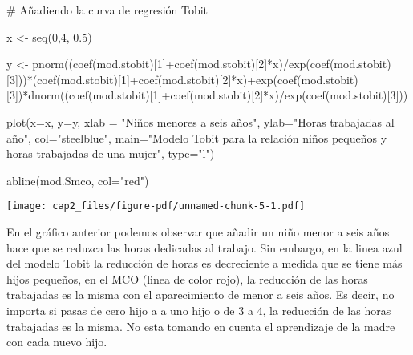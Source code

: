 \documentclass[
  letterpaper,
  DIV=11,
  numbers=noendperiod]{scrreprt}
\newenvironment{Shaded}{\begin{snugshade}}{\end{snugshade}}
\newcommand{\AttributeTok}[1]{\textcolor[rgb]{0.40,0.45,0.13}{#1}}
\newcommand{\CommentTok}[1]{\textcolor[rgb]{0.37,0.37,0.37}{#1}}
\newcommand{\DecValTok}[1]{\textcolor[rgb]{0.68,0.00,0.00}{#1}}
\newcommand{\FloatTok}[1]{\textcolor[rgb]{0.68,0.00,0.00}{#1}}
\newcommand{\FunctionTok}[1]{\textcolor[rgb]{0.28,0.35,0.67}{#1}}
\newcommand{\NormalTok}[1]{\textcolor[rgb]{0.00,0.23,0.31}{#1}}
\newcommand{\OtherTok}[1]{\textcolor[rgb]{0.00,0.23,0.31}{#1}}
\newcommand{\SpecialCharTok}[1]{\textcolor[rgb]{0.37,0.37,0.37}{#1}}
\newcommand{\StringTok}[1]{\textcolor[rgb]{0.13,0.47,0.30}{#1}}
\begin{document}
\begin{Shaded}
\begin{Highlighting}[]
\CommentTok{\# Añadiendo la curva de regresión Tobit}

\NormalTok{x }\OtherTok{\textless{}{-}} \FunctionTok{seq}\NormalTok{(}\DecValTok{0}\NormalTok{,}\DecValTok{4}\NormalTok{, }\FloatTok{0.5}\NormalTok{)}

\NormalTok{y }\OtherTok{\textless{}{-}} \FunctionTok{pnorm}\NormalTok{((}\FunctionTok{coef}\NormalTok{(mod.stobit)[}\DecValTok{1}\NormalTok{]}\SpecialCharTok{+}\FunctionTok{coef}\NormalTok{(mod.stobit)[}\DecValTok{2}\NormalTok{]}\SpecialCharTok{*}\NormalTok{x)}\SpecialCharTok{/}\FunctionTok{exp}\NormalTok{(}\FunctionTok{coef}\NormalTok{(mod.stobit)[}\DecValTok{3}\NormalTok{]))}\SpecialCharTok{*}\NormalTok{(}\FunctionTok{coef}\NormalTok{(mod.stobit)[}\DecValTok{1}\NormalTok{]}\SpecialCharTok{+}\FunctionTok{coef}\NormalTok{(mod.stobit)[}\DecValTok{2}\NormalTok{]}\SpecialCharTok{*}\NormalTok{x)}\SpecialCharTok{+}\FunctionTok{exp}\NormalTok{(}\FunctionTok{coef}\NormalTok{(mod.stobit)[}\DecValTok{3}\NormalTok{])}\SpecialCharTok{*}\FunctionTok{dnorm}\NormalTok{((}\FunctionTok{coef}\NormalTok{(mod.stobit)[}\DecValTok{1}\NormalTok{]}\SpecialCharTok{+}\FunctionTok{coef}\NormalTok{(mod.stobit)[}\DecValTok{2}\NormalTok{]}\SpecialCharTok{*}\NormalTok{x)}\SpecialCharTok{/}\FunctionTok{exp}\NormalTok{(}\FunctionTok{coef}\NormalTok{(mod.stobit)[}\DecValTok{3}\NormalTok{]))}

\FunctionTok{plot}\NormalTok{(}\AttributeTok{x=}\NormalTok{x,}
     \AttributeTok{y=}\NormalTok{y,}
     \AttributeTok{xlab =} \StringTok{"Niños menores a seis años"}\NormalTok{,}
     \AttributeTok{ylab=}\StringTok{"Horas trabajadas al año"}\NormalTok{,}
     \AttributeTok{col=}\StringTok{"steelblue"}\NormalTok{,}
     \AttributeTok{main=}\StringTok{"Modelo Tobit para la relación niños pequeños y horas trabajadas de una mujer"}\NormalTok{, }
     \AttributeTok{type=}\StringTok{"l"}\NormalTok{)}

\FunctionTok{abline}\NormalTok{(mod.Smco, }\AttributeTok{col=}\StringTok{"red"}\NormalTok{)}
\end{Highlighting}
\end{Shaded}

\texttt{[image: cap2\_files/figure-pdf/unnamed-chunk-5-1.pdf]}

En el gráfico anterior podemos observar que añadir un niño menor a seis
años hace que se reduzca las horas dedicadas al trabajo. Sin embargo, en
la linea azul del modelo Tobit la reducción de horas es decreciente a
medida que se tiene más hijos pequeños, en el MCO (linea de color rojo),
la reducción de las horas trabajadas es la misma con el aparecimiento de
menor a seis años. Es decir, no importa si pasas de cero hijo a a uno
hijo o de 3 a 4, la reducción de las horas trabajadas es la misma. No
esta tomando en cuenta el aprendizaje de la madre con cada nuevo hijo.
\end{document}
